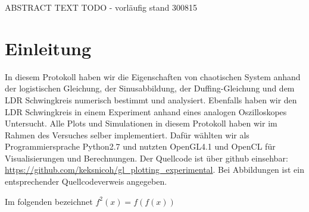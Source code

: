 \documentclass{scrartcl}
\begin{document}
\begin{description}
\item ABSTRACT TEXT TODO - vorläufig stand 300815
\end{description}

\section{Einleitung}
In diesem Protokoll haben wir die Eigenschaften von chaotischen System anhand der logistischen Gleichung, der Sinusabbildung, der Duffing-Gleichung und dem LDR Schwingkreis numerisch bestimmt und analysiert. Ebenfalls haben wir den LDR Schwingkreis in einem Experiment anhand eines analogen Oszilloskopes Untersucht.
Alle Plots und Simulationen in diesem Protokoll haben wir im Rahmen des Versuches selber implementiert. Dafür wählten wir als Programmiersprache Python2.7 und nutzten OpenGL4.1 und OpenCL für Visualisierungen und Berechnungen. Der Quellcode ist über github einsehbar: \url{https://github.com/keksnicoh/gl_plotting_experimental}. Bei Abbildungen ist ein entsprechender Quellcodeverweis angegeben. 

Im folgenden bezeichnet $f^2(x) = f(f(x))$

\tableofcontents
\end{document}
